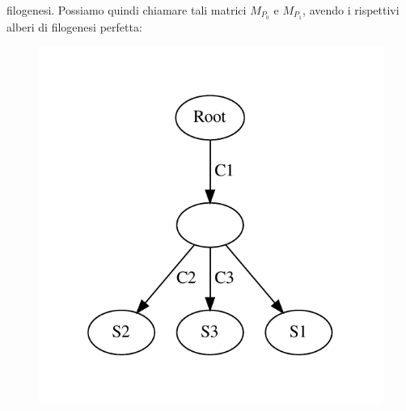 \documentclass[a4paper,12pt, oneside]{book}
\begin{document}
\begin{esempio}
  filogenesi. Possiamo quindi chiamare tali matrici $M_{P_0}$ e $M_{P_1}$,
  avendo i rispettivi alberi di filogenesi perfetta:
  \begin{figure}[H]
    \centering
    \includegraphics[scale = 0.5]{img/s1.pdf}

\end{figure}
\end{esempio}
\end{document}

